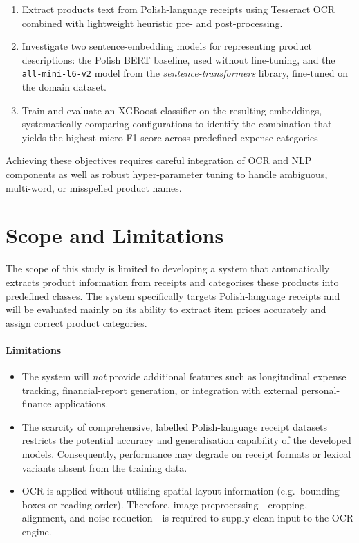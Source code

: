 \documentclass{SGGW-thesis-EN}
\begin{document}
\begin{enumerate}
  \item Extract products text from Polish-language receipts using Tesseract OCR combined with
        lightweight heuristic pre- and post-processing.

  \item Investigate two sentence-embedding models for representing product descriptions:
        the Polish BERT baseline, used without fine-tuning, and the \texttt{all-mini-l6-v2} model from
        the \emph{sentence-transformers} library, fine-tuned on the domain dataset.

  \item Train and evaluate an XGBoost classifier on the resulting embeddings, systematically
        comparing configurations to identify the combination that yields the highest micro-F1
        score across predefined expense categories
\end{enumerate}
\noindent
Achieving these objectives requires careful integration of OCR and NLP components as well as robust
hyper-parameter tuning to handle ambiguous, multi-word, or misspelled product names.

\section{Scope and Limitations}
The scope of this study is limited to developing a system that automatically extracts product information
from receipts and categorises these products into predefined classes.
The system specifically targets Polish-language receipts and will be evaluated mainly on its ability to
extract item prices accurately and assign correct product categories.

\paragraph{Limitations}

\begin{itemize}
  \item The system will \emph{not} provide additional features such as longitudinal expense tracking,
        financial-report generation, or integration with external personal-finance applications.
  \item The scarcity of comprehensive, labelled Polish-language receipt datasets restricts the potential
        accuracy and generalisation capability of the developed models.
        Consequently, performance may degrade on receipt formats or lexical variants absent from the
        training data.
  \item OCR is applied without utilising spatial layout information (e.g.\ bounding boxes or reading order).
        Therefore, image preprocessing—cropping, alignment, and noise reduction—is required to supply
        clean input to the OCR engine.
\end{itemize}
\end{document}
